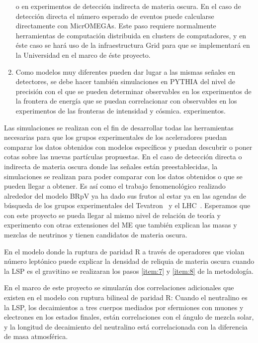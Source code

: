 \begin{enumerate}
  o en experimentos de detección indirecta \cite{Choi:2010xn} de
  materia oscura. En el caso de detección directa el número esperado
  de eventos puede calcularse directamente con MicrOMEGAs. Este paso
  requiere normalmente herramientas de computación distribuida en
  clusters de computadores, y en éste caso se hará uso de la
  infraestructura Grid para que se implementará en la Universidad en
  el marco de éste proyecto.
  \label{item:8}
\item Como modelos muy diferentes pueden dar lugar a las mismas
  señales en detectores, se debe hacer también simulaciones en PYTHIA
  del nivel de precisión con el que se pueden determinar observables
  en los experimentos de la frontera de energía que se puedan
  correlacionar con observables en los experimentos de las fronteras
  de intensidad y cósmica.
  experimentos.
  \label{item:9}
\end{enumerate}

Las simulaciones se realizan con el fin de desarrollar todas las
herramientas necesarias para que los grupos experimentales de los
aceleradores puedan comparar los datos obtenidos con modelos
específicos y puedan descubrir o poner cotas sobre las nuevas
partículas propuestas. En el caso de detección directa o indirecta de
materia oscura donde las señales están preestablecidas, la
simulaciones se realizan para poder comparar con los datos obtenidos o
que se pueden llegar a obtener. Es así como el trabajo fenomenológico
realizado alrededor del modelo BRpV ya ha dado sus frutos al estar ya
en las agendas de búsqueda de los grupos experimentales del
Tevatron~\cite{Brigliadori:2008vf} y el LHC~\cite{:2011iu}. Esperamos
que con este proyecto se pueda llegar al mismo nivel de relación de
teoría y experimento con otras extensiones del ME que
también explican las masas y mezclas de neutrinos y tienen candidatos
de materia oscura.



\begin{gravitinodm}
  En el modelo donde la ruptura de paridad R a través de operadores
  que violan número leptónico puede explicar la densidad de reliquia
  de materia oscura cuando la LSP es el gravitino se realizaran los
  pasos \ref{item:7} y \ref{item:8} de la metodología.
\end{gravitinodm}

\begin{brpvlhc}
  En el marco de este proyecto se simularán dos correlaciones
  adicionales que existen en el modelo con ruptura bilineal de paridad R:
  Cuando el neutralino es la LSP, los decaimientos a tres cuerpos
  mediados por sfermiones con muones y electrones en los estados
  finales, están correlaciones con el ángulo de mezcla solar, y la
  longitud de decaimiento del neutralino está correlacionada con la
  diferencia de masa atmosférica.
\end{brpvlhc}

